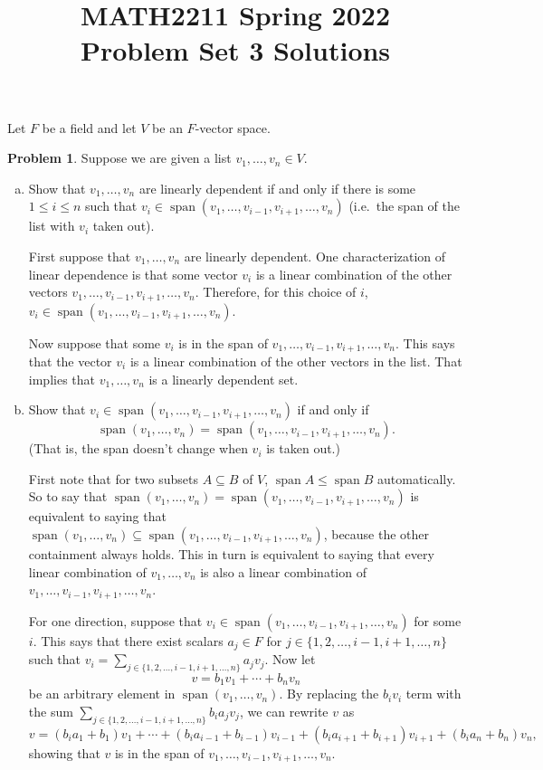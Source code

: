 \documentclass[11pt,oneside]{amsart}
\title{MATH2211 Spring 2022\\
Problem Set 3 Solutions}
\theoremstyle{definition}
\newtheorem{problem}{Problem}
\DeclareMathOperator{\Span}{span}
\begin{document}
    \maketitle

    Let $F$ be a field and let $V$ be an $F$-vector space.

    \begin{problem}
        Suppose we are given a list $v_1,\dots,v_n\in V$.
        \begin{enumerate}[(a)]
            \item Show that $v_1,\dots,v_n$ are linearly dependent if and only if there is some $1\leq i\leq n$ such that $v_i\in\Span(v_1,\dots,v_{i-1},v_{i+1},\dots,v_n)$ (i.e.\ the span of the list with $v_i$ taken out).
            \begin{solution}
                First suppose that $v_1,\dots,v_n$ are linearly dependent. One characterization of linear dependence is that some vector $v_i$ is a linear combination of the other vectors $v_1,\dots,v_{i-1},v_{i+1},\dots,v_n$. Therefore, for this choice of $i$, $v_i\in\Span(v_1,\dots,v_{i-1},v_{i+1},\dots,v_n)$.

                Now suppose that some $v_i$ is in the span of $v_1,\dots,v_{i-1},v_{i+1},\dots,v_n$. This says that the vector $v_i$ is a linear combination of the other vectors in the list. That implies that $v_1,\dots,v_n$ is a linearly dependent set.
            \end{solution}
            \item Show that $v_i\in\Span(v_1,\dots,v_{i-1},v_{i+1},\dots,v_n)$ if and only if
            \[\Span(v_1,\dots,v_n)=\Span(v_1,\dots,v_{i-1},v_{i+1},\dots,v_n).\]
            (That is, the span doesn't change when $v_i$ is taken out.)
            \begin{solution}
                First note that for two subsets $A\subseteq B$ of $V$, $\Span A\leq\Span B$ automatically. So to say that $\Span(v_1,\dots,v_n)=\Span(v_1,\dots,v_{i-1},v_{i+1},\dots,v_n)$ is equivalent to saying that $\Span(v_1,\dots,v_n)\subseteq\Span(v_1,\dots,v_{i-1},v_{i+1},\dots,v_n)$, because the other containment always holds. This in turn is equivalent to saying that every linear combination of $v_1,\dots,v_n$ is also a linear combination of $v_1,\dots,v_{i-1},v_{i+1},\dots,v_n$.

                For one direction, suppose that $v_i\in\Span(v_1,\dots,v_{i-1},v_{i+1},\dots,v_n)$ for some $i$. This says that there exist scalars $a_j\in F$ for $j\in\{1,2,\dots,i-1,i+1,\dots,n\}$ such that $v_i=\sum_{j\in\{1,2,\dots,i-1,i+1,\dots,n\}}a_jv_j$. Now let
                \[v=b_1v_1+\cdots+b_nv_n\]
                be an arbitrary element in $\Span(v_1,\dots,v_n)$. By replacing the $b_iv_i$ term with the sum $\sum_{j\in\{1,2,\dots,i-1,i+1,\dots,n\}}b_ia_jv_j$, we can rewrite $v$ as
                \[v=(b_ia_1+b_1)v_1+\cdots+(b_ia_{i-1}+b_{i-1})v_{i-1}+(b_ia_{i+1}+b_{i+1})v_{i+1}+(b_ia_n+b_n)v_n,\]
                showing that $v$ is in the span of $v_1,\dots,v_{i-1},v_{i+1},\dots,v_n$.


\end{solution}
\end{enumerate}
\end{problem}
\end{document}
